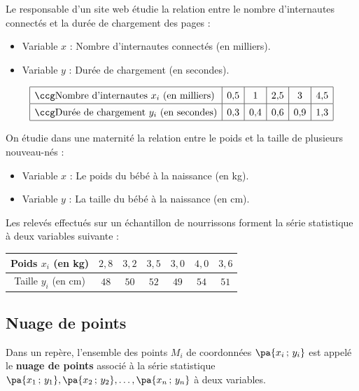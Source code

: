 \begin{ex}
	Le responsable d'un site web étudie la relation entre le nombre d'internautes connectés et la durée de chargement des pages :
	\begin{itemize}
		\item Variable $x$ : Nombre d'internautes connectés (en milliers).
		\item Variable $y$ : Durée de chargement (en secondes).
	\end{itemize}
	\[
		\def\arraystretch{1.4}
		\begin{array}{|l|c|c|c|c|c|}\hline
			\ccg \text{Nombre d'internautes } x_i \text{ (en milliers)} & 0{,}5 & 1     & 2{,}5 & 3     & 4{,}5 \\ \hline
			\ccg \text{Durée de chargement } y_i \text{ (en secondes)}  & 0{,}3 & 0{,}4 & 0{,}6 & 0{,}9 & 1{,}3 \\ \hline
		\end{array}
	\]
\end{ex}

\begin{ex}
	On étudie dans une maternité la relation entre le poids et la taille de plusieurs nouveau-nés :
	\begin{itemize}
		\item Variable $x$ : Le poids du bébé à la naissance (en kg).
		\item Variable $y$ : La taille du bébé à la naissance (en cm).
	\end{itemize}

	Les relevés effectués sur un échantillon de nourrissons forment la série statistique à deux variables suivante :

	\begin{center}
		\begin{tabular}{|c|c|c|c|c|c|c|}\hline
			\ccg Poids $x_i$ (en kg)  & $2{,}8$ & $3{,}2$ & $3{,}5$ & $3{,}0$ & $4{,}0$ & $3{,}6$ \\ \hline
			\ccg Taille $y_i$ (en cm) & $48$    & $50$    & $52$    & $49$    & $54$    & $51$    \\ \hline
		\end{tabular}
	\end{center}
\end{ex}

\subsection{Nuage de points}

\begin{defin}
	Dans un repère, l'ensemble des points $M_i$ de coordonnées $\pa{x_{i}\,;\,y_{i}}$ est appelé le \textbf{nuage de points} associé à la série statistique $\pa{x_{1}\,;\,y_{1}}, \pa{x_{2}\,;\,y_{2}}, \dots, \pa{x_{n}\,;\,y_{n}}$ à deux variables.
\end{defin}

